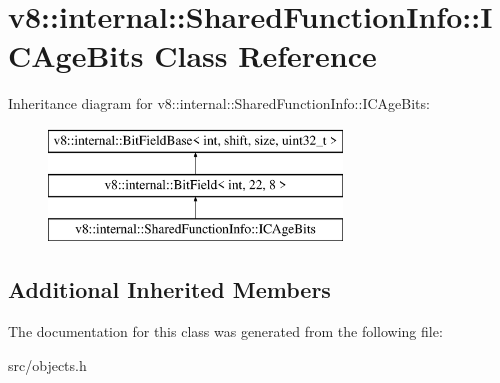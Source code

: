 \hypertarget{classv8_1_1internal_1_1_shared_function_info_1_1_i_c_age_bits}{}\section{v8\+:\+:internal\+:\+:Shared\+Function\+Info\+:\+:I\+C\+Age\+Bits Class Reference}
\label{classv8_1_1internal_1_1_shared_function_info_1_1_i_c_age_bits}
Inheritance diagram for v8\+:\+:internal\+:\+:Shared\+Function\+Info\+:\+:I\+C\+Age\+Bits\+:\begin{figure}[H]
\begin{center}
\leavevmode
\includegraphics[height=3.000000cm]{classv8_1_1internal_1_1_shared_function_info_1_1_i_c_age_bits}
\end{center}
\end{figure}
\subsection*{Additional Inherited Members}


The documentation for this class was generated from the following file\+:\begin{DoxyCompactItemize}
\item 
src/objects.\+h\end{DoxyCompactItemize}
